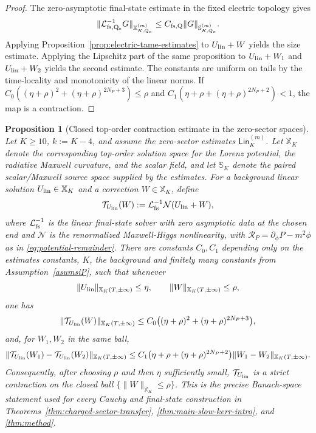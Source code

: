 \documentclass[11pt]{article}
\numberwithin{equation}{section}
\theoremstyle{plain}
\newtheorem{proposition}[theorem]{Proposition}
\theoremstyle{definition}
\theoremstyle{remark}
\newcommand{\Lin}{\mathsf{Lin}}
\begin{document}
\begin{proof}
The zero-asymptotic final-state estimate in the fixed electric topology gives
\begin{equation}
 \|\mathcal L^{-1}_{\rm fs,Q_e}G\|_{\mathbb X^{(m)}_{K,Q_e}}
 \le C_{\rm fs,Q}\|G\|_{\mathbb S^{(m)}_{K,Q_e}}.
\end{equation}
Applying Proposition~\ref{prop:electric-tame-estimates} to \(U_{\rm lin}+W\) yields the size estimate.  Applying the Lipschitz part of the same proposition to \(U_{\rm lin}+W_1\) and \(U_{\rm lin}+W_2\) yields the second estimate.  The constants are uniform on tails by the time-locality and monotonicity of the linear norms.  If \(C_0((\eta+\rho)^2+(\eta+\rho)^{2N_P+3})\le\rho\) and \(C_1(\eta+\rho+(\eta+\rho)^{2N_P+2})<1\), the map is a contraction.
\end{proof}

\begin{proposition}[Closed top-order contraction estimate in the zero-sector spaces]\label{prop:closed-sector-contraction}
Let $K\ge10$, $k:=K-4$, and assume the zero-sector estimates $\Lin_K^{(m)}$. Let $\mathbb X_K$ denote the corresponding top-order solution space for the Lorenz potential, the radiative Maxwell curvature, and the scalar field, and let $\mathbb S_K$ denote the paired scalar/Maxwell source space supplied by the estimates. For a background linear solution $U_{\rm lin}\in\mathbb X_K$ and a correction $W\in\mathbb X_K$, define
\begin{equation}
\mathcal T_{U_{\rm lin}}(W)
:=
\mathcal L^{-1}_{\rm fs}\mathcal N(U_{\rm lin}+W),
\end{equation}
where $\mathcal L^{-1}_{\rm fs}$ is the linear final-state solver with zero asymptotic data at the chosen end and $\mathcal N$ is the renormalized Maxwell-Higgs nonlinearity, with $\mathcal R_P=\partial_{\bar\phi}P-m^2\phi$ as in \eqref{eq:potential-remainder}. There are constants $C_0,C_1$ depending only on the estimates constants, $K$, the background and finitely many constants from Assumption~\ref{asumsiP}, such that whenever
\begin{equation}
\|U_{\rm lin}\|_{\mathbb X_K(T,\pm\infty)}\le\eta,
\qquad
\|W\|_{\mathbb X_K(T,\pm\infty)}\le\rho,
\end{equation}
one has
\begin{equation}
\|\mathcal T_{U_{\rm lin}}(W)\|_{\mathbb X_K(T,\pm\infty)}
\le
C_0\bigl((\eta+\rho)^2+(\eta+\rho)^{2N_P+3}\bigr),
\end{equation}
and, for $W_1,W_2$ in the same ball,
\begin{equation}
\|\mathcal T_{U_{\rm lin}}(W_1)-\mathcal T_{U_{\rm lin}}(W_2)\|_{\mathbb X_K(T,\pm\infty)}
\le
C_1\bigl(\eta+\rho+(\eta+\rho)^{2N_P+2}\bigr)
\|W_1-W_2\|_{\mathbb X_K(T,\pm\infty)}.
\end{equation}
Consequently, after choosing $\rho$ and then $\eta$ sufficiently small, $\mathcal T_{U_{\rm lin}}$ is a strict contraction on the closed ball $\{\|W\|_{\mathbb X_K}\le \rho\}$. This is the precise Banach-space statement used for every Cauchy and final-state construction in Theorems~\ref{thm:charged-sector-transfer}, \ref{thm:main-slow-kerr-intro}, and \ref{thm:method}.
\end{proposition}
\end{document}
